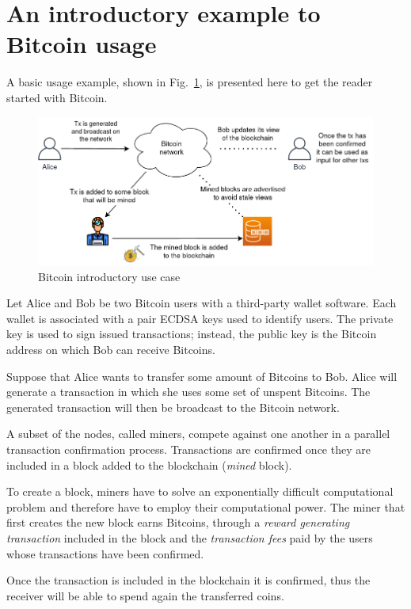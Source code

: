 \section{An introductory example to Bitcoin usage}\label{sec:useexample}
A basic usage example, shown in Fig.~\ref{fig:basicexample}, is presented here to get the reader started with Bitcoin.

\begin{figure}[h!]
	\includegraphics[width=.90\textwidth]{pict/basicexample.png}
	\centering
	\caption{Bitcoin introductory use case}
	\label{fig:basicexample}
\end{figure}

Let Alice and Bob be two Bitcoin users with a third-party wallet software. Each wallet is associated with a pair ECDSA keys used to identify users. The private key is used to sign issued transactions; instead, the public key is the Bitcoin address on which Bob can receive Bitcoins.

Suppose that Alice wants to transfer some amount of Bitcoins to Bob. Alice will generate a transaction in which she uses some set of unspent Bitcoins. The generated transaction will then be broadcast to the Bitcoin network.

A subset of the nodes, called miners, compete against one another in a parallel transaction confirmation process. Transactions are confirmed once they are included in a block added to the blockchain (\emph{mined} block).

To create a block, miners have to solve an exponentially difficult computational problem and therefore have to employ their computational power. The miner that first creates the new block earns Bitcoins, through a \emph{reward generating transaction} included in the block and the \emph{transaction fees} paid by the users whose transactions have been confirmed.

Once the transaction is included in the blockchain it is confirmed, thus the receiver will be able to spend again the transferred coins.

